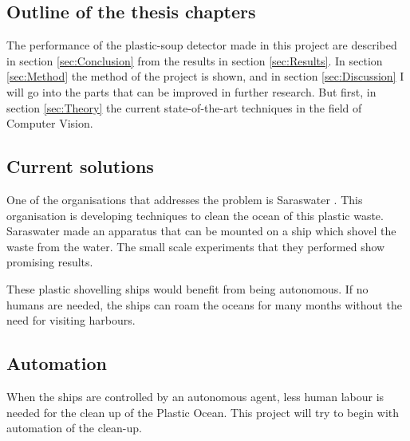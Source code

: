 \subsection{Outline of the thesis chapters}
\label{sec:Intro-Outline}
The performance of the plastic-soup detector made in this project are described in section \ref{sec:Conclusion} from the results in section \ref{sec:Results}.
In section \ref{sec:Method} the method of the project is shown, and in section \ref{sec:Discussion} I will go into the parts that can be improved in further research.
But first, in section \ref{sec:Theory} the current state-of-the-art techniques in the field of Computer Vision.















\iffalse



\subsection{Current solutions}
\label{sec:Intro-Current}


One of the organisations that addresses the problem is Saraswater \citeneed.
This organisation is developing techniques to clean the ocean of this plastic waste.
Saraswater made an apparatus that can be mounted on a ship which shovel the waste from the water.
The small scale experiments that they performed show promising results.

These plastic shovelling ships would benefit from being autonomous.
If no humans are needed, the ships can roam the oceans for many months without the need for visiting harbours.

\subsection{Automation}
\label{sec:Intro-Automate}
When the ships are controlled by an autonomous agent, less human labour is needed for the clean up of the Plastic Ocean.
This project will try to begin with automation of the clean-up.

